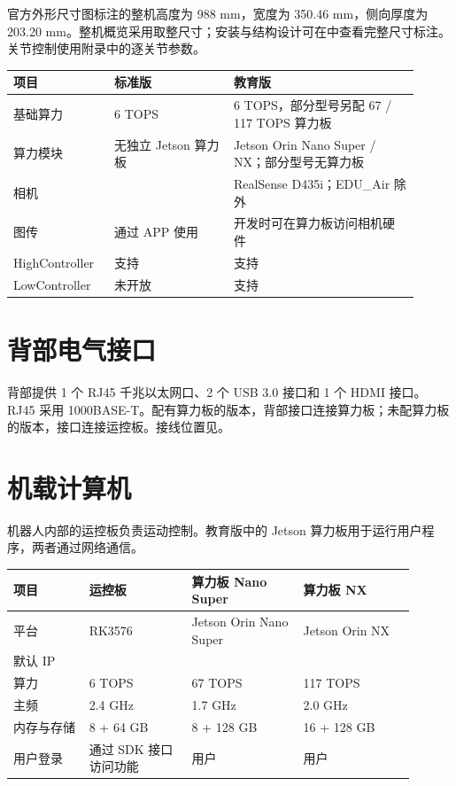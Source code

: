 官方外形尺寸图标注的整机高度为 988 mm，宽度为 350.46 mm，侧向厚度为 203.20 mm。整机概览采用取整尺寸；安装与结构设计可在中查看完整尺寸标注。关节控制使用附录中的逐关节参数。

\begingroup\small\renewcommand{\arraystretch}{1.15}
\begin{longtable}{@{}P{0.22\linewidth}P{0.27\linewidth}P{0.42\linewidth}@{}}
\toprule
\textbf{项目} & \textbf{标准版} & \textbf{教育版} \\
\midrule\endhead
基础算力 & 6 TOPS & 6 TOPS，部分型号另配 67 / 117 TOPS 算力板 \\
算力模块 & 无独立 Jetson 算力板 & Jetson Orin Nano Super / NX；部分型号无算力板 \\
相机 &  & RealSense D435i；EDU\_Air 除外 \\
图传 & 通过 APP 使用 & 开发时可在算力板访问相机硬件 \\
HighController & 支持 & 支持 \\
LowController & 未开放 & 支持 \\
\bottomrule\end{longtable}\endgroup

\section{背部电气接口}
背部提供 1 个 RJ45 千兆以太网口、2 个 USB 3.0 接口和 1 个 HDMI 接口。RJ45 采用 1000BASE-T。配有算力板的版本，背部接口连接算力板；未配算力板的版本，接口连接运控板。接线位置见。
\section{机载计算机}
机器人内部的运控板负责运动控制。教育版中的 Jetson 算力板用于运行用户程序，两者通过网络通信。

\begingroup\small\renewcommand{\arraystretch}{1.15}
\begin{longtable}{@{}P{0.17\linewidth}P{0.23\linewidth}P{0.25\linewidth}P{0.25\linewidth}@{}}
\toprule
\textbf{项目} & \textbf{运控板} & \textbf{算力板 Nano Super} & \textbf{算力板 NX} \\
\midrule\endhead
平台 & RK3576 & Jetson Orin Nano Super & Jetson Orin NX \\
默认 IP &  &  &  \\
算力 & 6 TOPS & 67 TOPS & 117 TOPS \\
主频 & 2.4 GHz & 1.7 GHz & 2.0 GHz \\
内存与存储 & 8 + 64 GB & 8 + 128 GB & 16 + 128 GB \\
用户登录 & 通过 SDK 接口访问功能 & 用户  & 用户  \\
\bottomrule\end{longtable}\endgroup

